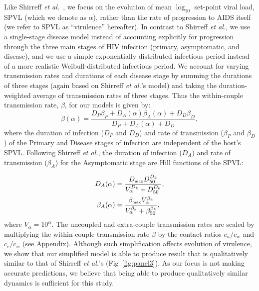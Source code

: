 \documentclass[10pt,letterpaper]{article}
\renewcommand{\figurename}{Fig}
\newcommand{\etal}{\textit{et al.}}
\newcommand{\tsub}[2]{#1_{{\textrm{\tiny #2}}}}
\begin{document}
Like Shirreff \etal\ \cite{shirreff_transmission_2011}, we focus on the evolution of mean $\log_{10}$ set-point viral load, SPVL (which we denote as $\alpha$), rather than the rate of progression to AIDS itself
(we refer to SPVL as ``virulence'' hereafter).
In contrast to Shirreff \etal, we use a single-stage disease model instead of accounting explicitly for progression through the three main stages of HIV infection (primary, asymptomatic, and disease), and we use a simple exponentially distributed infectious period instead of a more realistic Weibull-distributed infectious period. We account for varying transmission rates and durations of each disease stage by summing the durations of three stages (again based on Shirreff \etal's model) and taking the duration-weighted average of transmission rates of three stages. Thus the within-couple transmission rate, $\beta$, for our models is given by:
\begin{equation}
\beta (\alpha) = \frac{D_P \beta_P + D_A (\alpha) \beta_A (\alpha) + D_D \beta_D}{D_P + D_A (\alpha) + D_D},
\end{equation}
where the duration of infection ($D_P$ and $D_D$) and rate of transmission ($\beta_P$ and $\beta_D$) of the Primary and Disease stages
of infection are independent of the host's SPVL. Following Shirreff \etal, the duration of infection ($D_A$) and rate of transmission ($\beta_A$) for the Asymptomatic stage are Hill functions of the SPVL:

\begin{equation}
\begin{split}
D_A(\alpha) &= \frac{\tsub{D}{max} D_{50} ^{D_k}}{V_\alpha ^{D_k} + D_{50}^{D_k}}, \\
\beta_A(\alpha) &= \frac{\tsub{\beta}{max} V_\alpha ^ {\beta_k}}%
{V_\alpha^{\beta_k} + \beta_{50} ^{\beta_k}},
\end{split}
\end{equation}
where $V_{\alpha} = 10^\alpha$. 
The uncoupled and extra-couple transmission rates are scaled by multiplying the within-couple transmission rate $\beta$ by the contact ratios $c_u/c_w$ and $c_e/c_w$ (see Appendix). Although such simplification affects evolution of virulence, we show that our simplified model is able to produce result that is qualitatively similar to that of Shirreff \etal's \cite{shirreff_transmission_2011} (\figurename~\ref{fig:panel3}). As our focus is not making accurate predictions, we believe that being able to produce qualitatively similar dynamics is sufficient for this study.
\end{document}
